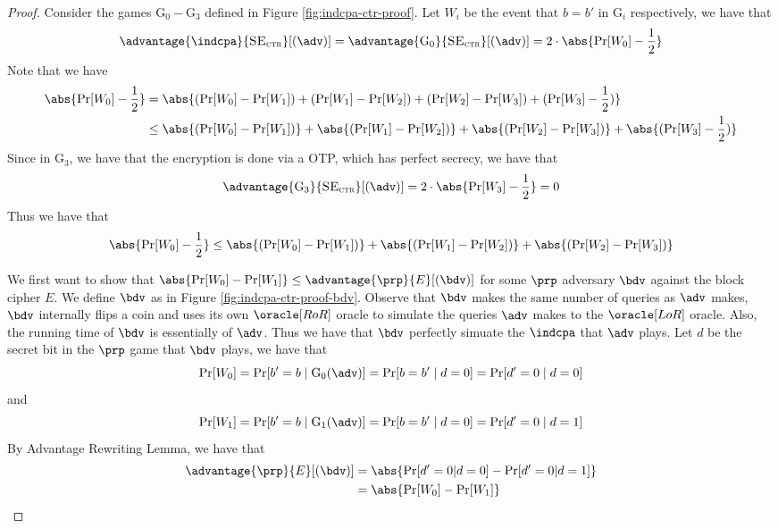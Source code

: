 \documentclass[11pt,a4paper]{article}
\newcommand{\SE}{\textsc{SE}}
\begin{document}
\begin{proof}
Consider the games $\mathrm{G}_0 - \mathrm{G}_3$ defined in Figure \ref{fig:indcpa-ctr-proof}. Let $W_i$ be the event that $b=b'$ in $\mathrm{G}_i$ respectively, we have that 
$$
\advantage{\indcpa}{\SE_\textsc{ctr}}[(\adv)] = \advantage{\mathrm{G_0}}{\SE_\textsc{ctr}}[(\adv)] = 2 \cdot \abs{\Pr[W_0] - \frac{1}{2}} 
$$
Note that we have 
$$
\begin{aligned}
\abs{\Pr[W_0] - \frac{1}{2}} &= \abs{(\Pr[W_0] - \Pr[W_1]) + (\Pr[W_1] - \Pr[W_2]) + (\Pr[W_2] - \Pr[W_3]) + (\Pr[W_3] - \frac{1}{2})} \\  
&\leq \abs{(\Pr[W_0] - \Pr[W_1])} + \abs{(\Pr[W_1] - \Pr[W_2])} + \abs{(\Pr[W_2] - \Pr[W_3])} + \abs{(\Pr[W_3] - \frac{1}{2})}
\end{aligned}
$$
Since in $\mathrm{G_3}$, we have that the encryption is done via a OTP, which has perfect secrecy, we have that 
$$
\advantage{\mathrm{G_3}}{\SE_\textsc{ctr}}[(\adv)] = 2 \cdot \abs{\Pr[W_3] - \frac{1}{2}} = 0
$$
Thus we have that 
$$
\abs{\Pr[W_0] - \frac{1}{2}} \leq \abs{(\Pr[W_0] - \Pr[W_1])} + \abs{(\Pr[W_1] - \Pr[W_2])} + \abs{(\Pr[W_2] - \Pr[W_3])}
$$

We first want to show that $\abs{\Pr[W_0] - \Pr[W_1]} \leq \advantage{\prp}{E}[(\bdv)]$ for some $\prp$ adversary $\bdv$ against the block cipher $E$. We define $\bdv$ as in Figure \ref{fig:indcpa-ctr-proof-bdv}. Observe that $\bdv$ makes the same number of queries as $\adv$ makes, $\bdv$ internally flips a coin and uses its own $\oracle[RoR]$ oracle to simulate the queries $\adv$ makes to the $\oracle[LoR]$ oracle. Also, the running time of $\bdv$ is essentially of $\adv$. Thus we have that $\bdv$ perfectly simuate the $\indcpa$ that $\adv$ plays. Let $d$ be the secret bit in the $\prp$ game that $\bdv$ plays, we have that 
$$
\Pr[W_0] = \Pr[b'=b \mid \mathrm{G_0}(\adv)] = \Pr[b=b' \mid d = 0] = \Pr[d' = 0 \mid d = 0]
$$
and 
$$
\Pr[W_1] = \Pr[b'=b \mid \mathrm{G_1}(\adv)] = \Pr[b=b' \mid d = 0] = \Pr[d' = 0 \mid d = 1]
$$
By Advantage Rewriting Lemma, we have that 
$$
\begin{aligned}
\advantage{\prp}{E}[(\bdv)] &= \abs{\Pr[d' = 0 | d = 0] - \Pr[d'=0 | d = 1]}  \\ 
&= \abs{\Pr[W_0] - \Pr[W_1]}
\end{aligned} 
$$


\end{proof}
\end{document}
